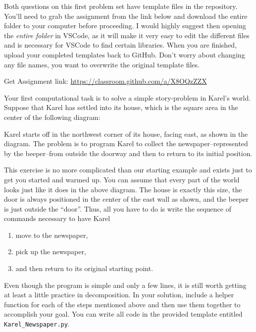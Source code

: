 \documentclass[letterpaper,12pt]{exam}
\begin{document}
Both questions on this first problem set have template files in the repository. You'll need to grab the assignment from the link below and download the entire folder to your computer before proceeding. I would highly suggest then opening the \emph{entire folder} in VSCode, as it will make it very easy to edit the different files and is necessary for VSCode to find certain libraries. When you are finished, upload your completed templates back to GitHub. Don't worry about changing any file names, you want to overwrite the original template files.
	\begin{center}
		Get Assignment link: \url{https://classroom.github.com/a/X8OQzZZX}
	\end{center}
\begin{questions}
	\begin{question}
		Your first computational task is to solve a simple story-problem in Karel's world. Suppose that Karel has settled into its house, which is the square area in the center of the following diagram:
		\begin{center}
		\end{center}
		Karel starts off in the northwest corner of its house, facing east, as shown in the diagram. The problem is to program Karel to collect the newspaper--represented by the beeper--from outside the doorway and then to return to its initial position.

		This exercise is no more complicated than our starting example and exists just to get you started and warmed up. You can assume that every part of the world looks just like it does in the above diagram. The house is exactly this size, the door is always positioned in the center of the east wall as shown, and the beeper is just outside the ``door''. Thus, all you have to do is write the sequence of commands necessary to have Karel
		\begin{enumerate}
			\item move to the newspaper,
			\item pick up the newspaper,
			\item and then return to its original starting point.
		\end{enumerate}
		Even though the program is simple and only a few lines, it is still worth getting at least a little practice in decomposition. In your solution, include a helper function for each of the steps mentioned above and then use them together to accomplish your goal. You can write all code in the provided template entitled \texttt{Karel\_Newspaper.py}.
	\end{question}


\end{questions}
\end{document}
